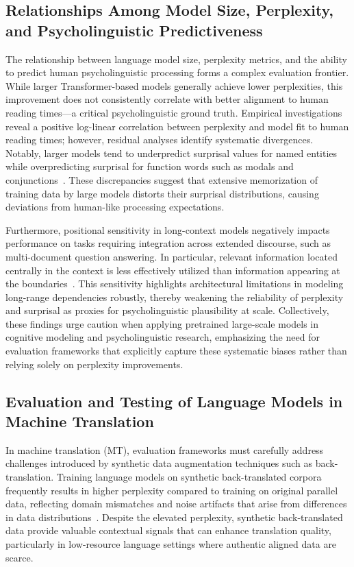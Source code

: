 \documentclass[sigconf]{acmart}
\begin{document}
\subsection{Relationships Among Model Size, Perplexity, and Psycholinguistic Predictiveness}

The relationship between language model size, perplexity metrics, and the ability to predict human psycholinguistic processing forms a complex evaluation frontier. While larger Transformer-based models generally achieve lower perplexities, this improvement does not consistently correlate with better alignment to human reading times—a critical psycholinguistic ground truth. Empirical investigations reveal a positive log-linear correlation between perplexity and model fit to human reading times; however, residual analyses identify systematic divergences. Notably, larger models tend to underpredict surprisal values for named entities while overpredicting surprisal for function words such as modals and conjunctions~\cite{ref33,ref35}. These discrepancies suggest that extensive memorization of training data by large models distorts their surprisal distributions, causing deviations from human-like processing expectations.

Furthermore, positional sensitivity in long-context models negatively impacts performance on tasks requiring integration across extended discourse, such as multi-document question answering. In particular, relevant information located centrally in the context is less effectively utilized than information appearing at the boundaries~\cite{ref33}. This sensitivity highlights architectural limitations in modeling long-range dependencies robustly, thereby weakening the reliability of perplexity and surprisal as proxies for psycholinguistic plausibility at scale. Collectively, these findings urge caution when applying pretrained large-scale models in cognitive modeling and psycholinguistic research, emphasizing the need for evaluation frameworks that explicitly capture these systematic biases rather than relying solely on perplexity improvements.

\subsection{Evaluation and Testing of Language Models in Machine Translation}

In machine translation (MT), evaluation frameworks must carefully address challenges introduced by synthetic data augmentation techniques such as back-translation. Training language models on synthetic back-translated corpora frequently results in higher perplexity compared to training on original parallel data, reflecting domain mismatches and noise artifacts that arise from differences in data distributions~\cite{ref37}. Despite the elevated perplexity, synthetic back-translated data provide valuable contextual signals that can enhance translation quality, particularly in low-resource language settings where authentic aligned data are scarce.
\end{document}
